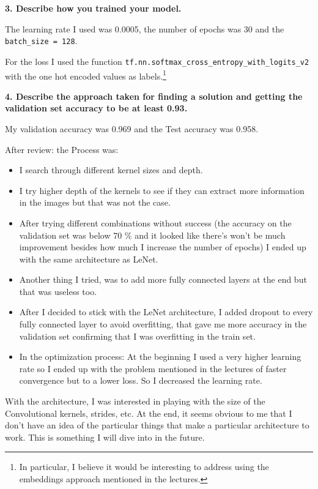 \documentclass[11pt, a4paper]{article}
\begin{document}
\textbf{3. Describe how you trained your model.}

The learning rate I used was 0.0005, the number of epochs was 30 and the \texttt{batch\_size = 128}. 


For the loss I used the function \texttt{tf.nn.softmax\_cross\_entropy\_with\_logits\_v2} with the one hot encoded values as labels.\footnote{In particular, I believe it would be interesting to address using the embeddings approach mentioned in the lectures.}



\textbf{4. Describe the approach taken for finding a solution and getting the validation set accuracy to be at least 0.93.}


My validation accuracy was 0.969 and the Test accuracy was 0.958. 

After review: the Process was:


	\begin{itemize}
		\item I search through different kernel sizes and depth.
		\item I try higher depth of the kernels to see if they can extract more information in the images but that was not the case. 
		\item After trying different combinations without success (the accuracy on the validation set was below 70 \% and it looked like there's won't be much improvement besides how much I increase the number of epochs) I ended up with the same architecture as LeNet.
		\item Another thing I tried, was to add more fully connected layers at the end but that was useless too.
		\item After I decided to stick with the LeNet architecture, I added dropout to every fully connected layer to avoid overfitting, that gave me more accuracy in the validation set confirming that I was overfitting in the train set. 
		\item In the optimization process: At the beginning I used a very higher learning rate so I ended up with the problem mentioned in the lectures of faster convergence but to a lower loss. So I decreased the learning rate.
	\end{itemize}







With the architecture, I was interested in playing with the size of the Convolutional kernels, strides, etc. At the end, it seems obvious to me that I don't have an idea of the particular things that make a particular architecture to work. This is something I will dive into in the future. 
\end{document}
